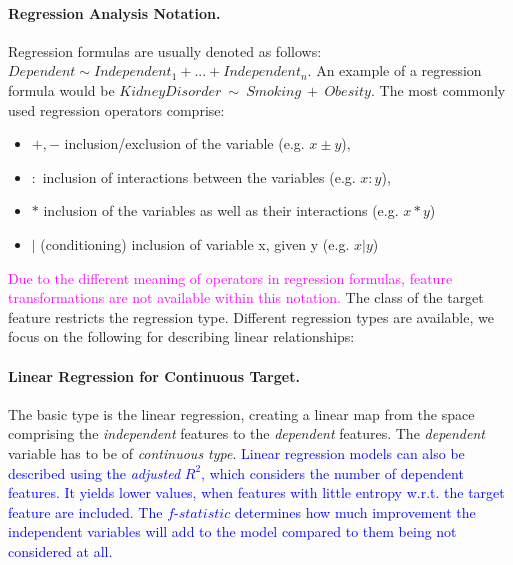 \documentclass[journal]{style/vgtc} 			          %
\newcommand{\add}[1]{\textcolor{blue}{#1}}
\newcommand{\magenta}[1]{\textcolor{magenta}{#1}}
\begin{document}
\paragraph{Regression Analysis Notation.} Regression formulas are usually denoted as follows:
$Dependent \sim Independent_1 + ... + Independent_n$.
An example of a regression formula would be $KidneyDisorder~\sim~Smoking~+~Obesity$.
The most commonly used regression operators comprise:
\begin{itemize}
	\item $+,-$ inclusion/exclusion of the variable (e.g. $x\pm y$),
	\item $:$ inclusion of interactions between the variables (e.g. $x:y$),
	\item $*$ inclusion of the variables as well as their interactions (e.g. $x*y$)
	\item $|$ (conditioning) inclusion of variable x, given y (e.g. $x|y$)
\end{itemize}
\magenta{
Due to the different meaning of operators in regression formulas, feature transformations are not available within this notation.
}
The class of the target feature restricts the regression type.
Different regression types are available, we focus on the following for describing linear relationships:
\paragraph{Linear Regression for Continuous Target.}
The basic type is the linear regression, creating a linear map from the space comprising the \emph{independent} features to the \emph{dependent} features.
The \emph{dependent} variable has to be of \emph{continuous type}.
\add{
Linear regression models can also be described using the \emph{adjusted} $R^2$, which considers the number of dependent features.
It yields lower values, when features with little entropy w.r.t. the target feature are included.
The $f$-$statistic$ determines how much improvement the independent variables will add to the model compared to them being not considered at all.
}
\end{document}
